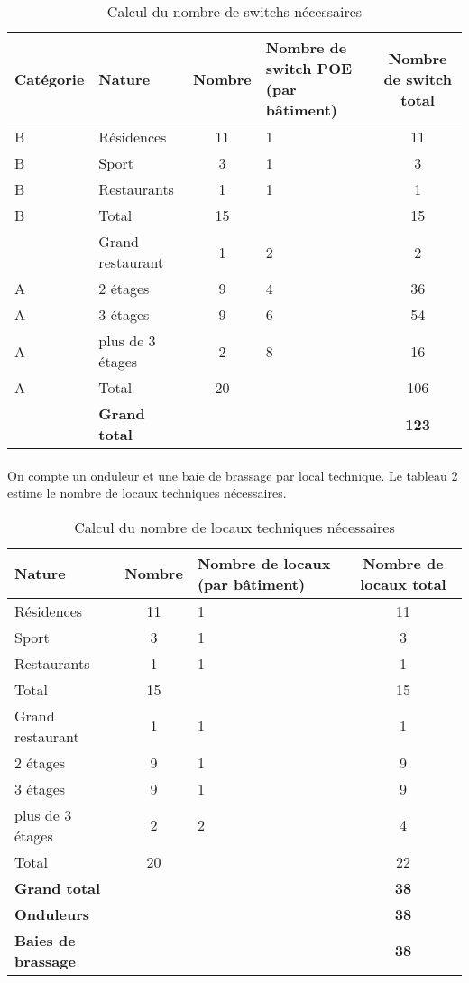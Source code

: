 \begin{table}[p]
  \caption{\label{table_switchs} Calcul du nombre de switchs nécessaires}
  \begin{tabular}{|l|l|c|m{4cm}|c|}
    \hline
    Catégorie & Nature & Nombre & Nombre de switch \ac{POE} (par bâtiment) & Nombre
    de switch total \\
    \hline
    B & Résidences  & 11 & 1 & 11 \\
    B & Sport       & 3  & 1 & 3  \\
    B & Restaurants & 1  & 1 & 1  \\
    \hline
    B & Total       & 15 &       & 15 \\
    \hline
      & Grand restaurant & 1 & 2 & 2 \\
    \hline
    A & 2 étages         & 9 & 4 & 36 \\
    A & 3 étages         & 9 & 6 & 54 \\
    A & plus de 3 étages & 2 & 8 & 16 \\
    \hline
    A & Total            & 20 &  & 106 \\
    \hline
    \hline
      & \bf{Grand total} & & & \bf{123} \\
    \hline
  \end{tabular}
\end{table}

\paragraph{} On compte un onduleur et une baie de brassage par local technique. Le tableau
\ref{table_locaux} estime le nombre de locaux techniques nécessaires.

\begin{table}[p]
  \caption{\label{table_locaux} Calcul du nombre de locaux techniques nécessaires}
  \begin{tabular}{|l|c|m{4cm}|c|}
    \hline
    Nature & Nombre & Nombre de locaux (par bâtiment) & Nombre de locaux total \\
    \hline
    Résidences  & 11 & 1 & 11 \\
    Sport       & 3  & 1 & 3 \\
    Restaurants & 1  & 1 & 1 \\
    \hline
    Total       & 15 &   & 15 \\
    \hline
    Grand restaurant & 1 & 1 & 1 \\
    \hline
    2 étages         & 9 & 1 & 9 \\
    3 étages         & 9 & 1 & 9 \\
    plus de 3 étages & 2 & 2 & 4 \\
    \hline
    Total            & 20 & & 22 \\
    \hline
    \hline
    \bf{Grand total} & & & \bf{38} \\
    \bf{Onduleurs} & & & \bf{38} \\
    \bf{Baies de brassage} & & & \bf{38} \\
    \hline
  \end{tabular}
\end{table}

